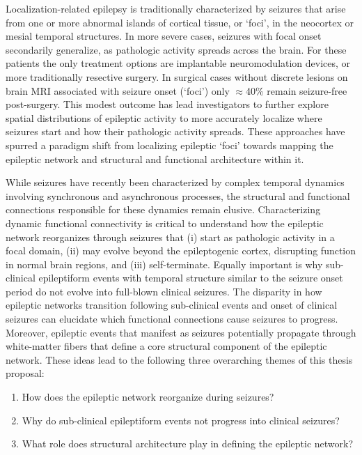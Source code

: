 Localization-related epilepsy is traditionally characterized by seizures that arise from one or more abnormal islands of cortical tissue, or `foci', in the neocortex or mesial temporal structures. In more severe cases, seizures with focal onset secondarily generalize, as pathologic activity spreads across the brain. For these patients the only treatment options are implantable neuromodulation devices, or more traditionally resective surgery. In surgical cases without discrete lesions on brain MRI associated with seizure onset (‘foci’) only $\approx$40\% remain seizure-free post-surgery. This modest outcome has lead investigators to further explore spatial distributions of epileptic activity to more accurately localize where seizures start and how their pathologic activity spreads. These approaches have spurred a paradigm shift from localizing epileptic ‘foci’ towards mapping the epileptic network and structural and functional architecture within it.

While seizures have recently been characterized by complex temporal dynamics involving synchronous and asynchronous processes, the structural and functional connections responsible for these dynamics remain elusive. Characterizing dynamic functional connectivity is critical to understand how the epileptic network reorganizes through seizures that (i) start as pathologic activity in a focal domain, (ii) may evolve beyond the epileptogenic cortex, disrupting function in normal brain regions, and (iii) self-terminate. Equally important is why sub-clinical epileptiform events with temporal structure similar to the seizure onset period do not evolve into full-blown clinical seizures. The disparity in how epileptic networks transition following sub-clinical events and onset of clinical seizures can elucidate which functional connections cause seizures to progress. Moreover, epileptic events that manifest as seizures potentially propagate through white-matter fibers that define a core structural component of the epileptic network. These ideas lead to the following three overarching themes of this thesis proposal:
\begin{enumerate}[topsep=1ex, itemsep=0pt]
    \item How does the epileptic network reorganize during seizures?
    \item Why do sub-clinical epileptiform events not progress into clinical seizures?
    \item What role does structural architecture play in defining the epileptic network?
\end{enumerate}

